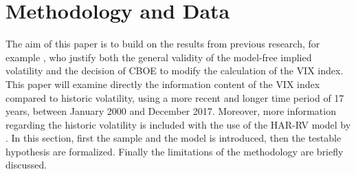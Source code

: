 
\section{Methodology and Data}\label{sec:4MethodData}
The aim of this paper is to build on the results from previous research, for example \textcite{jiang2003}, who justify both the general validity of the model-free implied volatility and the decision of \ac{CBOE} to modify the calculation of the \ac{VIX} index. This paper will examine directly the information content of the \ac{VIX} index compared to historic volatility, using a more recent and longer time period of 17 years, between January 2000 and December 2017. Moreover, more information regarding the historic volatility is included with the use of the HAR-RV model by \textcite{corsi2009}. In this section, first the sample and the model is introduced, then the testable hypothesis are formalized. Finally the limitations of the methodology are briefly discussed.

